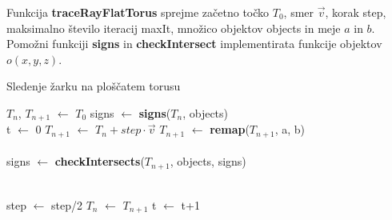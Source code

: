 \documentclass[titlepage]{article}
\begin{document}
Funkcija \textbf{traceRayFlatTorus} sprejme začetno točko $T_{0}$, smer $\vec{v}$, korak step, maksimalno število iteracij maxIt, množico objektov objects in meje $a$ in $b$.
Pomožni funkciji \textbf{signs} in \textbf{checkIntersect} implementirata funkcije objektov \( o(x,y,z) \).
\begin{algorithm}[H]
    \caption{Sledenje žarku na ploščatem torusu}
\begin{algorithmic}

    \State $T_{n}$, $T_{n+1}$ $\gets$ $T_{0}$
    \State signs $\gets$ \textbf{signs}($T_{n}$, objects)
    \\
    \State t $\gets$ 0
      \State {}
      \State {}
    \EndIf
    \State $T_{n+1}$ $\gets$ $T_{n}+step \cdot \vec{v}$
    \State $T_{n+1}$ $\gets$ \textbf{remap}($T_{n+1}$, a, b)
    \\
    \\
    \State signs $\gets$ \textbf{checkIntersects}($T_{n+1}$, objects, signs)
    \\
    \\

        \State step $\gets$ step/2
    \Else
      \State $T_{n}$ $\gets$ $T_{n+1}$
      \State t $\gets$ t+1
    \EndIf
  \EndWhile
\EndFunction
\end{algorithmic}
\end{algorithm}

\newpage
\end{document}
